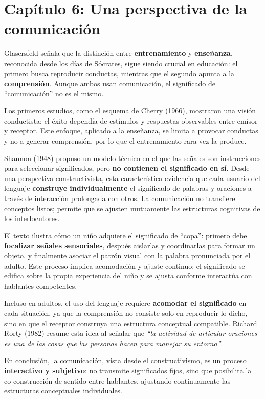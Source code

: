 \documentclass{article}
\begin{document}
\section*{Capítulo 6: Una perspectiva de la comunicación}

Glasersfeld señala que la distinción entre \textbf{entrenamiento} y \textbf{enseñanza}, reconocida desde los días de Sócrates, sigue siendo crucial en educación: el primero busca reproducir conductas, mientras que el segundo apunta a la \textbf{comprensión}. Aunque ambos usan comunicación, el significado de “comunicación” no es el mismo.

Los primeros estudios, como el esquema de Cherry (1966), mostraron una visión conductista: el éxito dependía de estímulos y respuestas observables entre emisor y receptor. Este enfoque, aplicado a la enseñanza, se limita a provocar conductas y no a generar comprensión, por lo que el entrenamiento rara vez la produce.

Shannon (1948) propuso un modelo técnico en el que las señales son instrucciones para seleccionar significados, pero \textbf{no contienen el significado en sí}. Desde una perspectiva constructivista, esta característica evidencia que cada usuario del lenguaje \textbf{construye individualmente} el significado de palabras y oraciones a través de interacción prolongada con otros. La comunicación no transfiere conceptos listos; permite que se ajusten mutuamente las estructuras cognitivas de los interlocutores.

El texto ilustra cómo un niño adquiere el significado de “copa”: primero debe \textbf{focalizar señales sensoriales}, después aislarlas y coordinarlas para formar un objeto, y finalmente asociar el patrón visual con la palabra pronunciada por el adulto. Este proceso implica acomodación y ajuste continuo; el significado se edifica sobre la propia experiencia del niño y se ajusta conforme interactúa con hablantes competentes.

Incluso en adultos, el uso del lenguaje requiere \textbf{acomodar el significado} en cada situación, ya que la comprensión no consiste solo en reproducir lo dicho, sino en que el receptor construya una estructura conceptual compatible. Richard Rorty (1982) resume esta idea al señalar que \emph{“la actividad de articular oraciones es una de las cosas que las personas hacen para manejar su entorno”}.

En conclusión, la comunicación, vista desde el constructivismo, es un proceso \textbf{interactivo y subjetivo}: no transmite significados fijos, sino que posibilita la co-construcción de sentido entre hablantes, ajustando continuamente las estructuras conceptuales individuales.
\end{document}
